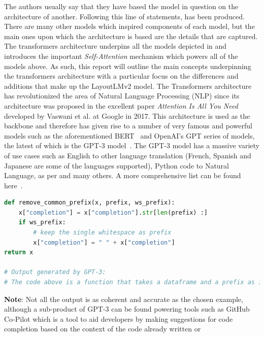 The authors usually say that they have based the model in question on the architecture of another. Following this
line of statements,  has been produced. There are many other models which inspired components of
each model, but the main ones upon which the architecture is based are the details that are captured.
\bigbreak
The transformers architecture underpins all the models depicted in  and introduces the
important \emph{Self-Attention} mechanism which powers all of the models above. As such, this report
will outline the main concepts underpinning the transformers architecture with a particular focus
on the differences and additions that make up the LayoutLMv2 model.
\bigbreak
The Transformers architecture has revolutionized the area of Natural Language Processing (NLP) since its architecture was proposed in
the excellent paper \emph{Attention Is All You Need}~\autocite{vaswaniAttentionAllYou} developed by Vaswani et al. at Google in 2017.
\bigbreak
This architecture is used as the backbone and therefore has given rise to a number of very famous and powerful models such as the
aforementioned BERT~\autocite{BERT} and OpenAI's GPT series of models, the latest of which is the GPT-3 model~\autocite{GPT3PowersNext2021}.
The GPT-3 model has a massive variety of use cases such as English to other language translation (French, Spanish and Japanese are some of the
languages supported), Python code to Natural Language, as per  and many others.
A more comprehensive list can be found here~\autocite{GPT3PowersNext2021}.
\newpage
\begin{lstlisting}[language=python, label={code:GPT3_NL_translation}, caption={GPT-3 Python code for human language translation as per~\autocite{OpenAIAPI}.}]
def remove_common_prefix(x, prefix, ws_prefix): 
    x["completion"] = x["completion"].str[len(prefix) :] 
    if ws_prefix: 
        # keep the single whitespace as prefix 
        x["completion"] = " " + x["completion"] 
return x 

# Output generated by GPT-3:
# The code above is a function that takes a dataframe and a prefix as input and returns a dataframe with the prefix removed from the completion column.
\end{lstlisting}
\bigbreak
\textbf{Note}: Not all the output is as coherent and accurate as the chosen example, although a sub-product of GPT-3 can be found powering tools
such as GitHub Co-Pilot which is a tool to aid developers by making suggestions for code completion based on the context of the code already written or
